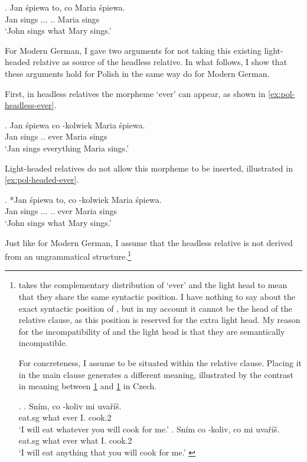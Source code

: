 \exg. Jan śpiewa to, co Maria śpiewa.\\
Jan sings ... .. Maria sings\\
`John sings what Mary sings.' \label{ex:pol-light-headed}

For Modern German, I gave two arguments for not taking this existing light-headed relative as source of the headless relative. In what follows, I show that these arguments hold for Polish in the same way do for Modern German.

First, in headless relatives the morpheme  `ever' can appear, as shown in \ref{ex:pol-headless-ever}.

\exg. Jan śpiewa co -kolwiek Maria śpiewa.\\
Jan sings .. ever Maria sings\\
`Jan sings everything Maria sings.' \label{ex:pol-headless-ever}

Light-headed relatives do not allow this morpheme to be inserted, illustrated in \ref{ex:pol-headed-ever}.

\exg. *Jan śpiewa to, co -kolwiek Maria śpiewa.\\
Jan sings ... .. ever Maria sings\\
`John sings what Mary sings.' \label{ex:pol-headed-ever}

Just like for Modern German, I assume that the headless relative is not derived from an ungrammatical structure.\footnote{
\citet{citko2004} takes the complementary distribution of  `ever' and the light head to mean that they share the same syntactic position. I have nothing to say about the exact syntactic position of , but in my account it cannot be the head of the relative clause, as this position is reserved for the extra light head. My reason for the incompatibility of  and the light head is that they are semantically incompatible.

For concreteness, I assume  to be situated within the relative clause. Placing it in the main clause generates a different meaning, illustrated by the contrast in meaning between \ref{ex:cz-wh-ever} and \ref{ex:cz-ever-wh} in Czech.

\ex.
\ag. Sním, co -koliv mi uvaříš.\\
 eat.sg what ever I. cook.2\\
 `I will eat whatever you will cook for me.'\label{ex:cz-wh-ever}
\bg. Sním co -koliv, co mi uvaříš.\\
 eat.sg what ever what I. cook.2\\
 `I will eat anything that you will cook for me.' \label{ex:cz-ever-wh}

\phantom{x}
}


